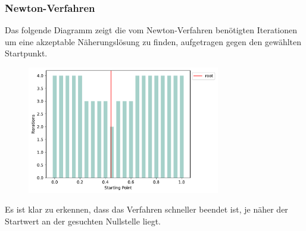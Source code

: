 \documentclass[a4paper,12pt]{article}
\newcommand{\1}{1\hspace{-0,9ex}1}
\begin{document}
\subsubsection*{Newton-Verfahren}
Das folgende Diagramm zeigt die vom Newton-Verfahren benötigten Iterationen um eine akzeptable Näherungslösung zu finden, aufgetragen gegen den gewählten Startpunkt.

\begin{figure}[H]
	\centering
	\includegraphics[width=0.75\textwidth]{plots/newton_iterations_by_starting_point.pdf}
\end{figure}

Es ist klar zu erkennen, dass das Verfahren schneller beendet ist, je näher der Startwert an der gesuchten Nullstelle liegt.
\end{document}
